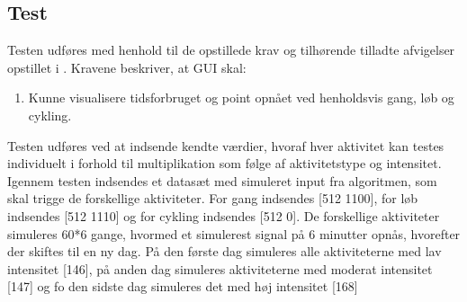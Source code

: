 \subsection{Test}
Testen udføres med henhold til de opstillede krav og tilhørende tilladte afvigelser opstillet i . Kravene beskriver, at GUI skal:
\begin{enumerate}
	\item Kunne visualisere tidsforbruget og point opnået ved henholdsvis gang, løb og cykling. 
\end{enumerate}


Testen udføres ved at indsende kendte værdier, hvoraf hver aktivitet kan testes individuelt i forhold til multiplikation som følge af aktivitetstype og intensitet.
Igennem testen indsendes et datasæt med simuleret input fra algoritmen, som skal trigge de forskellige aktiviteter. For gang indsendes [512 1100], for løb indsendes [512 1110] og for cykling indsendes [512 0]. De forskellige aktiviteter simuleres 60*6 gange, hvormed et simulerest signal på 6 minutter opnås, hvorefter der skiftes til en ny dag. På den første dag simuleres alle aktiviteterne med lav intensitet [146], på anden dag simuleres aktiviteterne med moderat intensitet [147] og fo den sidste dag simuleres det med høj intensitet [168]

